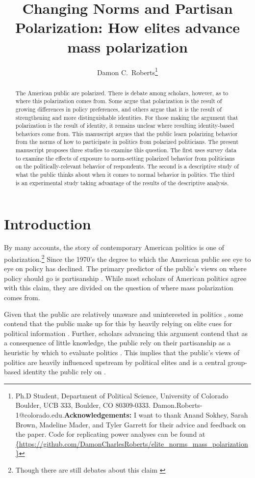 \documentclass [12pt]{article}
\title{Changing Norms and Partisan Polarization: How elites advance mass polarization}
\author{Damon C.\ Roberts\footnote{Ph.D Student,
Department of Political Science, University of Colorado Boulder, UCB 333, Boulder, CO 80309-0333. Damon.Roberts-1@colorado.edu.\newline \textbf{Acknowledgements:} I want to thank Anand Sokhey, Sarah Brown, Madeline Mader, and Tyler Garrett for their advice and feedback on the paper. \newline Code for replicating power analyses can be found at \url{{https://github.com/DamonCharlesRoberts/elite_norms_mass_polarization}}}}
\date{}
\begin{document}
\maketitle
\begin{abstract}
The American public are polarized. There is debate among scholars, however, as to where this polarization comes from. Some argue that polarization is the result of growing differences in policy preferences, and others argue that it is the result of strengthening and more distinguishable identities. For those making the argument that polarization is the result of identity, it remains unclear where resulting identity-based behaviors come from. This manuscript argues that the public learn polarizing behavior from the norms of how to participate in politics from polarized politicians. The present manuscript proposes three studies to examine this question. The first uses survey data to examine the effects of exposure to norm-setting polarized behavior from politicians on the politically-relevant behavior of respondents. The second is a descriptive study of what the public thinks about when it comes to normal behavior in politics. The third is an experimental study taking advantage of the results of the descriptive analysis. 
\end{abstract}

\newpage
\doublespace
\newpage 
\section{Introduction}
By many accounts, the story of contemporary American politics is one of polarization.\footnote{Though there are still debates about this claim \citep[see][for a discussion of this debate]{iyengar_et-al_2012}} Since the 1970's the degree to which the American public see eye to eye on policy has declined. The primary predictor of the public's views on where policy should go is partisanship \citep[Chapter 6]{campbell_et-al_1969}. While most scholars of American politics agree with this claim, they are divided on the question of where mass polarization comes from. 

Given that the public are relatively unaware and uninterested in politics \citep[see][]{berelson_1952, delli-carpini_keeter_1996}, some contend that the public make up for this by heavily relying on elite cues for political information \citep{zaller_1992, zaller_2003}. Further, scholars advancing this argument contend that as a consequence of little knowledge, the public rely on their partisanship as a heuristic by which to evaluate politics \citep{delli-carpini_keeter_1996}. This implies that the public's views of politics are heavily influenced upstream by political elites and is a central group-based identity the public rely on \citep[Chapter 7]{schickler_green_1997,campbell_et-al_1969}. 
\end{document}
